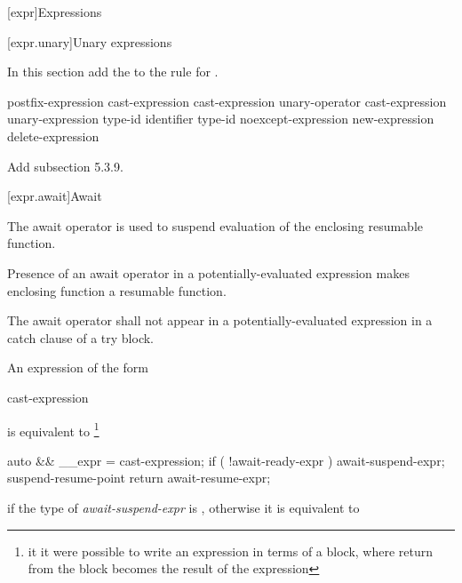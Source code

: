 

\setcounter{chapter}{4}
[expr]{Expressions}

\setcounter{section}{2}
[expr.unary]{Unary expressions}

In this section add the   
to the rule for .

\begin{bnf}
	\br
	postfix-expression\br
	\terminal{++} cast-expression\br
	\terminal{-{-}} cast-expression\br
	\br
	unary-operator cast-expression\br
	 unary-expression\br
	 type-id \terminal{)}\br
	 \terminal{(} identifier \terminal{)}\br
	 type-id \terminal{)}\br
	noexcept-expression\br
	new-expression\br
	delete-expression\br
\end{bnf}

Add subsection 5.3.9.

\setcounter{subsection}{8}
[expr.await]{Await}

\pnum
The await operator is used to suspend evaluation of the enclosing resumable function.

\pnum
Presence of an await operator in a potentially-evaluated expression makes enclosing function a resumable function.

\pnum
The await operator shall not appear in a potentially-evaluated expression in a catch clause of a try block.


\pnum
An  expression of the form

\begin{ncbnf}
	 cast-expression
\end{ncbnf}

is equivalent to \footnote{it it were possible to write
an expression in terms of a block, where return from the 
block becomes the result of the expression}

\begin{codeblock}
{
  auto && __expr = cast-expression;
  if ( !await-ready-expr ) {
    await-suspend-expr;
    suspend-resume-point
  }
  return await-resume-expr;
}
\end{codeblock}

if the type of \textit{await-suspend-expr} is , otherwise it is equivalent to

